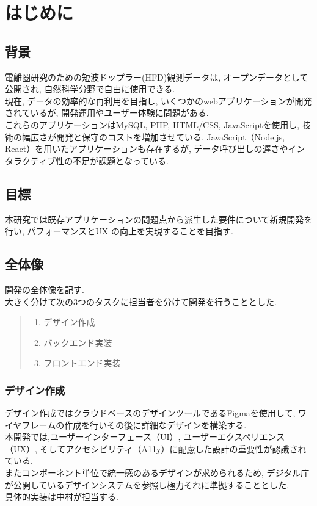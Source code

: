 \section{はじめに}
\subsection{背景}
電離圏研究のための短波ドップラー(HFD)観測データは, オープンデータとして公開され, 自然科学分野で自由に使用できる. \\
現在, データの効率的な再利用を目指し, いくつかのwebアプリケーションが開発されているが, 開発運用やユーザー体験に問題がある. \\
これらのアプリケーションはMySQL, PHP, HTML/CSS, JavaScriptを使用し, 技術の幅広さが開発と保守のコストを増加させている. 
JavaScript（Node.js, React）を用いたアプリケーションも存在するが, データ呼び出しの遅さやインタラクティブ性の不足が課題となっている. \cite{no1}

\subsection{目標}
本研究では既存アプリケーションの問題点から派生した要件について新規開発を行い,  パフォーマンスとUX の向上を実現することを目指す.

\subsection{全体像}
開発の全体像を記す.\\
大きく分けて次の3つのタスクに担当者を分けて開発を行うこととした.
\begin{quote}
	\begin{enumerate}
		\item デザイン作成
		\item バックエンド実装
		\item フロントエンド実装
	\end{enumerate}
\end{quote}

\subsubsection{デザイン作成}
デザイン作成ではクラウドベースのデザインツールであるFigmaを使用して, ワイヤフレームの作成を行いその後に詳細なデザインを構築する. \\
本開発では,ユーザーインターフェース（UI）, ユーザーエクスペリエンス（UX）, そしてアクセシビリティ（A11y）に配慮した設計の重要性が認識されている. \cite{no2} \\
またコンポーネント単位で統一感のあるデザインが求められるため, デジタル庁が公開しているデザインシステムを参照し極力それに準拠することとした.\cite{no3}\cite{no4}\\
具体的実装は中村が担当する.

